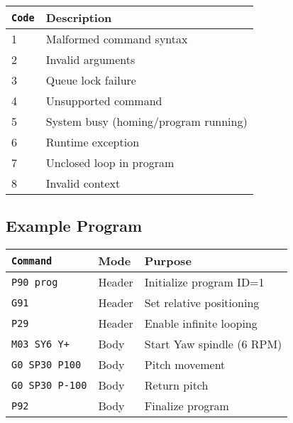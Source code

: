 \begin{tabular}{ll}
  \hline
  \texttt{Code} & Description                          \\
  \hline
  1             & Malformed command syntax             \\
  2             & Invalid arguments                    \\
  3             & Queue lock failure                   \\
  4             & Unsupported command                  \\
  5             & System busy (homing/program running) \\
  6             & Runtime exception                    \\
  7             & Unclosed loop in program             \\
  8             & Invalid context                      \\
  \hline
\end{tabular}


\subsection*{Example Program}
\begin{tabular}{lll}
  \hline
  \texttt{Command}       & Mode   & Purpose                   \\
  \hline
  \texttt{P90 prog}      & Header & Initialize program ID=1   \\
  \texttt{G91}           & Header & Set relative positioning  \\
  \texttt{P29}           & Header & Enable infinite looping   \\
  \texttt{M03 SY6 Y+}    & Body   & Start Yaw spindle (6 RPM) \\
  \texttt{G0 SP30 P100}  & Body   & Pitch movement            \\
  \texttt{G0 SP30 P-100} & Body   & Return pitch              \\
  \texttt{P92}           & Body   & Finalize program          \\
  \hline
\end{tabular}
